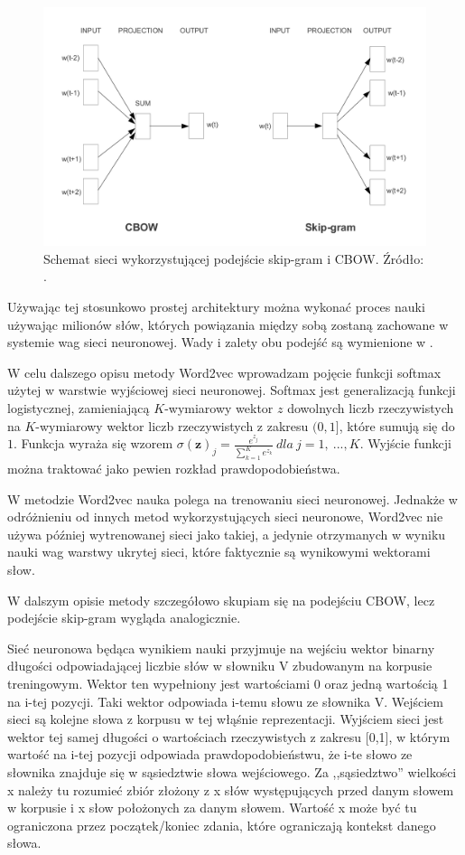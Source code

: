 \documentclass[pl]{minipw} %
\begin{document}
\begin{figure}[H]
	\centering
	\includegraphics[width=1\textwidth]{img/skipgram_cbow.png}
	\caption{Schemat sieci wykorzystującej podejście skip-gram i CBOW. Źródło: \cite{word2vec}.}
\end{figure}
Używając tej stosunkowo prostej architektury można wykonać proces nauki używając milionów słów, których powiązania między sobą zostaną zachowane w systemie wag sieci neuronowej. Wady i zalety obu podejść są wymienione w \cite{google_word2vec}.

W celu dalszego opisu metody Word2vec wprowadzam pojęcie funkcji softmax użytej w warstwie wyjściowej sieci neuronowej. Softmax jest generalizacją funkcji logistycznej, zamieniającą $K$-wymiarowy wektor $z$ dowolnych liczb rzeczywistych na $K$-wymiarowy wektor liczb rzeczywistych z zakresu $(0,1]$, które sumują się do $1$. Funkcja wyraża się wzorem $\sigma (\mathbf {z} )_{j}={\frac {e^{z_{j}}}{\sum _{k=1}^{K}e^{z_{k}}}}\ dla\ j=1,\ ...,K$. Wyjście funkcji można traktować jako pewien rozkład prawdopodobieństwa.

W metodzie Word2vec nauka polega na trenowaniu sieci neuronowej. Jednakże w odróżnieniu od innych metod wykorzystujących sieci neuronowe, Word2vec nie używa później wytrenowanej sieci jako takiej, a jedynie otrzymanych w wyniku nauki wag warstwy ukrytej sieci, które faktycznie są wynikowymi wektorami słow.

W dalszym opisie metody szczegółowo skupiam się na podejściu CBOW, lecz podejście skip-gram wygląda analogicznie.

Sieć neuronowa będąca wynikiem nauki przyjmuje na wejściu wektor binarny długości odpowiadającej liczbie słów w słowniku V zbudowanym na korpusie treningowym. Wektor ten wypełniony jest wartościami 0 oraz jedną wartością 1 na i-tej pozycji. Taki wektor odpowiada i-temu słowu ze słownika V. Wejściem sieci są kolejne słowa z korpusu w tej włąśnie reprezentacji. Wyjściem sieci jest wektor tej samej długości o wartościach rzeczywistych z zakresu [0,1], w którym wartość na i-tej pozycji odpowiada prawdopodobieństwu, że i-te słowo ze słownika znajduje się w sąsiedztwie słowa wejściowego. Za ,,sąsiedztwo'' wielkości x należy tu rozumieć zbiór złożony z x słów występujących przed danym słowem w korpusie i x słow położonych za danym słowem. Wartość x może być tu ograniczona przez początek/koniec zdania, które ograniczają kontekst danego słowa.
\end{document}
